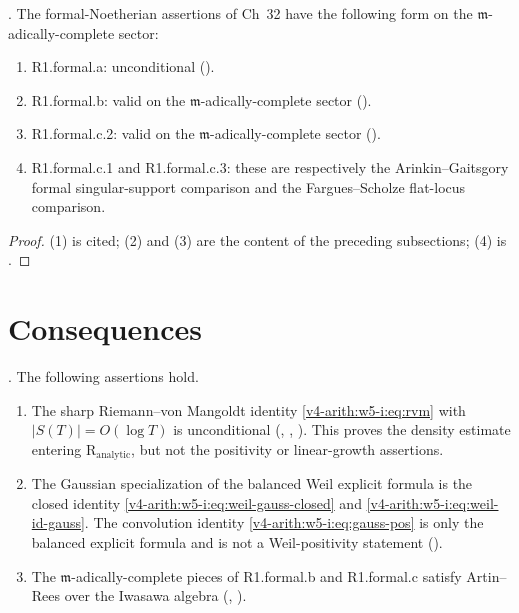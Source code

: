 \begin{theorem}
\label{v4-arith:w5-i:thm:formal-summary}
\ClaimStatusProvedHere. The formal-Noetherian assertions of
Ch~32 have the following form on the
\(\mathfrak{m}\)-adically-complete sector:
\begin{enumerate}
\item R1.formal.a: unconditional
().
\item R1.formal.b: valid on the
\(\mathfrak{m}\)-adically-complete sector
().
\item R1.formal.c.2: valid on the
\(\mathfrak{m}\)-adically-complete sector
().
\item R1.formal.c.1 and R1.formal.c.3: these are respectively the
Arinkin--Gaitsgory formal singular-support comparison and the
Fargues--Scholze flat-locus comparison.
\end{enumerate}
\end{theorem}

\begin{proof}
(1) is cited; (2) and (3) are the content of the preceding
subsections; (4) is
.
\end{proof}

\section{Consequences}
\label{v4-arith:w5-i:summary}

\begin{proposition}
\label{v4-arith:w5-i:prop:three-exact-inputs}
\ClaimStatusProvedHere.
The following assertions hold.

\begin{enumerate}
\item The sharp Riemann--von Mangoldt identity
\eqref{v4-arith:w5-i:eq:rvm} with \(|S(T)|=O(\log T)\) is
unconditional
(,
,
). This proves the density estimate
entering \(\mathrm{R}_{\mathrm{analytic}}\), but not the positivity or
linear-growth assertions.
\item The Gaussian specialization of the balanced Weil explicit formula
is the closed identity \eqref{v4-arith:w5-i:eq:weil-gauss-closed} and
\eqref{v4-arith:w5-i:eq:weil-id-gauss}. The convolution
identity \eqref{v4-arith:w5-i:eq:gauss-pos} is only the balanced
explicit formula and is not a Weil-positivity statement
().
\item The \(\mathfrak{m}\)-adically-complete pieces of
R1.formal.b and R1.formal.c satisfy Artin--Rees over the Iwasawa algebra
(,
).
\end{enumerate}
\end{proposition}

